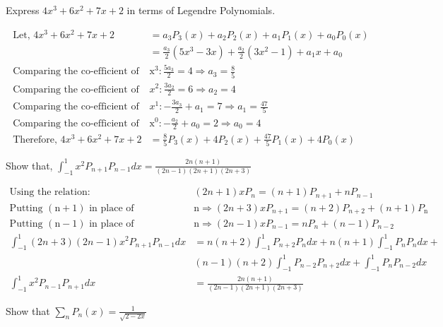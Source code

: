 \begin{exercise}
	Express $4 x^{3}+6 x^{2}+7 x+2$ in terms of Legendre Polynomials.
\end{exercise}
\begin{answer}
	\begin{align*}
	\text { Let, } 4 x^{3}+6 x^{2}+7 x+2&=a_{3} P_{3}(x)+a_{2} P_{2}(x)+a_{1} P_{1}(x)+a_{0} P_{0}(x)\\
	&=\frac{a_{3}}{2}\left(5 x^{3}-3 x\right)+\frac{a_{2}}{2}\left(3 x^{2}-1\right)+a_{1} x+a_{0}\\
	\text { Comparing the co-efficient of } &\mathrm{x}^{3}: \frac{5 a_{3}}{2}=4 \Rightarrow a_{3}=\frac{8}{5}\\
	\text { Comparing the co-efficient of }& x^{2}: \frac{3 a_{2}}{2}=6 \Rightarrow a_{2}=4\\
	\text { Comparing the co-efficient of }& x^{1}:-\frac{3 a_{3}}{2}+a_{1}=7 \Rightarrow a_{1}=\frac{47}{5}\\
	\text { Comparing the co-efficient of }& \mathrm{x}^{0}:-\frac{a_{2}}{2}+a_{0}=2 \Rightarrow a_{0}=4\\
	\text { Therefore, } 4 x^{3}+6 x^{2}+7 x+2&=\frac{8}{5} P_{3}(x)+4 P_{2}(x)+\frac{47}{5} P_{1}(x)+4 P_{0}(x)
	\end{align*}
\end{answer}
\begin{exercise}
	Show that, $\int_{-1}^{1} x^{2} P_{n+1} P_{n-1} d x=\frac{2 n(n+1)}{(2 n-1)(2 n+1)(2 n+3)}$
\end{exercise}
\begin{answer}
	\begin{align*}
	\text{Using the relation: }&(2 n+1) x P_{n}=(n+1) P_{n+1}+n P_{n-1}\\
	\text{Putting $(\mathrm{n}+1)$ in place of }&\mathrm{n} \Rightarrow(2 n+3) x P_{n+1}=(n+2) P_{n+2}+(n+1) P_{\mathrm{n}}\\
	\text{Putting $(\mathrm{n}-1)$ in place of }&\mathrm{n} \Rightarrow(2 n-1) x P_{n-1}=n P_{n}+(n-1) P_{n-2}\\
	\int_{-1}^{1}(2 n+3)(2 n-1) x^{2} P_{n+1} P_{n-1} d x&=n(n+2) \int_{-1}^{1} P_{n+2} P_{n} d x+n(n+1) \int_{-1}^{1} P_{n} P_{n} d x+\\
	&(n-1)(n+2) \int_{-1}^{1} P_{n-2} P_{n+2} d x+\int_{-1}^{1} P_{n} P_{n-2} d x\\
	 \int_{-1}^{1} x^{2} P_{n-1} P_{n+1} d x&=\frac{2 n(n+1)}{(2 n-1)(2 n+1)(2 n+3)}
	\end{align*}
\end{answer}
\begin{exercise}
	Show that $\sum_{n} P_{n}(x)=\frac{1}{\sqrt{2-2 x}}$
\end{exercise}
